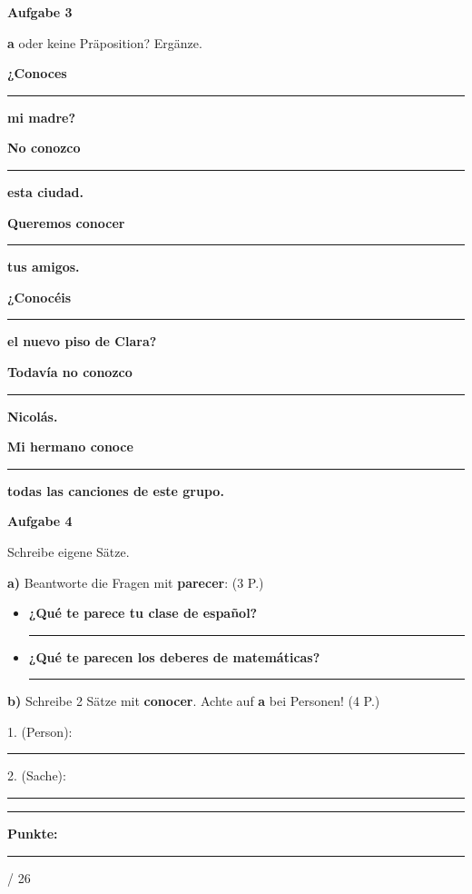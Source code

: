 \documentclass[10pt, a4paper]{article}
\newcommand{\maxpunkte}{26}
\newcommand{\es}[1]{\textbf{#1}}
\newcommand{\luecke}[1]{\rule{#1}{0.4pt}}
\newcommand{\punktebox}[1]{\hfill\fbox{\small \_/#1}}
\newenvironment{aufgabe}[1]{%
    \needspace{5\baselineskip}%
    \vspace{8pt}
    \noindent\textbf{\textcolor{akzent}{Aufgabe #1}}
    \vspace{4pt}
    \nopagebreak[4]%
}{%
    \vspace{4pt}
}
\begin{document}

\begin{aufgabe}{3}
\es{a} oder keine Präposition? Ergänze. \punktebox{6}
\end{aufgabe}

\begin{teilaufgaben}
    \item \es{¿Conoces} \luecke{1cm} \es{mi madre?}
    \item \es{No conozco} \luecke{1cm} \es{esta ciudad.}
    \item \es{Queremos conocer} \luecke{1cm} \es{tus amigos.}
    \item \es{¿Conocéis} \luecke{1cm} \es{el nuevo piso de Clara?}
    \item \es{Todavía no conozco} \luecke{1cm} \es{Nicolás.}
    \item \es{Mi hermano conoce} \luecke{1cm} \es{todas las canciones de este grupo.}
\end{teilaufgaben}


\begin{aufgabe}{4}
Schreibe eigene Sätze. \punktebox{7}
\end{aufgabe}

\textbf{a)} Beantworte die Fragen mit \es{parecer}: (3 P.)

\begin{itemize}[leftmargin=2em, itemsep=2pt]
    \item \es{¿Qué te parece tu clase de español?}

    \vspace{2pt}
    \luecke{12cm}

    \item \es{¿Qué te parecen los deberes de matemáticas?}

    \vspace{2pt}
    \luecke{12cm}
\end{itemize}

\textbf{b)} Schreibe 2 Sätze mit \es{conocer}. Achte auf \es{a} bei Personen! (4 P.)

\vspace{4pt}
1. (Person): \luecke{10cm}

\vspace{4pt}
2. (Sache): \luecke{10cm}


\vspace{12pt}
\hrule
\vspace{8pt}

\begin{flushright}
\textbf{Punkte:} \luecke{1cm} / \maxpunkte
\end{flushright}
\end{document}
